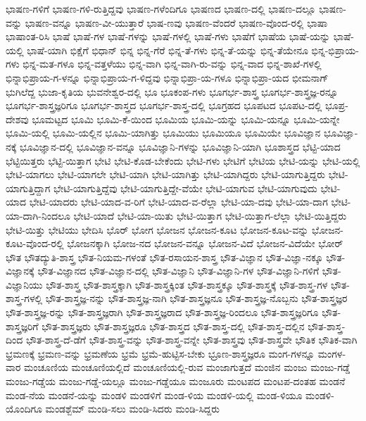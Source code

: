 {ಭಾಷಣ-ಗಳಿಗೆ
ಭಾಷಣ-ಗಳಿ-ರುತ್ತಿದ್ದವು
ಭಾಷಣ-ಗಳೆಂದಿಗೂ
ಭಾಷಣದ
ಭಾಷಣ-ದಲ್ಲಿ
ಭಾಷಣ-ದಲ್ಲೂ
ಭಾಷಣ-ವನ್ನು
ಭಾಷಣ-ವನ್ನೂ
ಭಾಷಣ-ವೀ-ಯುತ್ತಾರೆ
ಭಾಷ-ಣವು
ಭಾಷಣ-ವೆಂದರೆ
ಭಾಷಣ-ವೊಂದ-ರಲ್ಲಿ
ಭಾಷಾ
ಭಾಷಾಂತ-ರಿಸಿ
ಭಾಷೆ
ಭಾಷೆ-ಗಳ
ಭಾಷೆ-ಗಳನ್ನು
ಭಾಷೆ-ಗಳಲ್ಲಿ
ಭಾಷೆ-ಗಳು
ಭಾಷೆಗೆ
ಭಾಷೆಯ
ಭಾಷೆ-ಯನ್ನು
ಭಾಷೆ-ಯಲ್ಲಿ
ಭಾಷೆ-ಯಾಗಿ
ಭಿಕ್ಷೆಗೆ
ಭಿಧಾನ್
ಭಿನ್ನ
ಭಿನ್ನ-ಗೆರೆ
ಭಿನ್ನ-ತೆ-ಗಳು
ಭಿನ್ನ-ತೆ-ಯನ್ನು
ಭಿನ್ನ-ತೆಯೇನೂ
ಭಿನ್ನ-ಭಿಪ್ರಾಯ-ಗಳು
ಭಿನ್ನ-ಮತ-ಗಳೂ
ಭಿನ್ನ-ವತ್ತಳೆಯು
ಭಿನ್ನ-ವಾಗಿ
ಭಿನ್ನ-ವಾಗಿ-ರು-ವನ್ನು
ಭಿನ್ನ-ವಾದ
ಭಿನ್ನ-ಶಾಖೆ-ಗಳಲ್ಲಿ
ಭಿನ್ನಾಭಿಪ್ರಾಯ-ಗ-ಳನ್ನೂ
ಭಿನ್ನಾಭಿಪ್ರಾಯ-ಗ-ಳಿದ್ದವು
ಭಿನ್ನಾಭಿಪ್ರಾ-ಯ-ಗಳೂ
ಭಿನ್ನಾಭಿಪ್ರಾ-ಯದ
ಭೀಮನಾಗ್
ಭುಗಿಲೆದ್ದ
ಭುಜಾ-ಕೃತಿಯ
ಭುವನೇಶ್ವರ-ದಲ್ಲಿ
ಭೂ
ಭೂಕಂಪ-ಗಳು
ಭೂಗರ್ಭ-ಶಾಸ್ತ್ರ
ಭೂಗರ್ಭ-ಶಾಸ್ತ್ರಜ್ಞ-ರನ್ನೂ
ಭೂಗರ್ಭ-ಶಾಸ್ತ್ರಜ್ಞರಿಗೂ
ಭೂಗರ್ಭ-ಶಾಸ್ತ್ರದ
ಭೂಗರ್ಭ-ಶಾಸ್ತ್ರ-ದಲ್ಲಿ
ಭೂಗ್ರಹದ
ಭೂಪಟದ
ಭೂಪಟ-ದಲ್ಲಿ
ಭೂಪ್ರ-ದೇಶವು
ಭೂಮಟ್ಟದ
ಭೂಮಿ
ಭೂಮಿ-ಕೆ-ಯಿಂದ
ಭೂಮಿಯ
ಭೂಮಿ-ಯನ್ನು
ಭೂಮಿ-ಯನ್ನೂ
ಭೂಮಿ-ಯನ್ನೇ
ಭೂಮಿ-ಯಲ್ಲಿ
ಭೂಮಿ-ಯಲ್ಲಿನ
ಭೂಮಿ-ಯಾಗಿತ್ತು
ಭೂಮಿಯು
ಭೂಮಿಯೂ
ಭೂಮಿಯೇ
ಭೂವಿಜ್ಞಾನ
ಭೂವಿಜ್ಞಾ-ನಕ್ಕೆ
ಭೂವಿಜ್ಞಾನ-ದಲ್ಲಿ
ಭೂವಿಜ್ಞಾನ-ವನ್ನೂ
ಭೂವಿಜ್ಞಾನಿ-ಗಳನ್ನು
ಭೂವಿಜ್ಞಾನಿ-ಯಾಗಿ
ಭೂಶಾಸ್ತ್ರದ
ಭೆಟ್ಟಿ-ಯಾದ
ಭೆಟ್ಟಿಯಿತ್ತರು
ಭೆಟ್ಟಿ-ಯಿತ್ತಾಗ
ಭೇಟಿ
ಭೇಟಿ-ಕೊಡ-ಬೇಕೆಂದು
ಭೇಟಿ-ಗಳು
ಭೇಟಿಗೆ
ಭೇಟಿಯ
ಭೇಟಿ-ಯನ್ನು
ಭೇಟಿ-ಯಲ್ಲಿ
ಭೇಟಿ-ಯಾಗಲು
ಭೇಟಿ-ಯಾಗಲೇ
ಭೇಟಿ-ಯಾಗಿ
ಭೇಟಿ-ಯಾಗಿತ್ತು
ಭೇಟಿ-ಯಾಗಿದ್ದರು
ಭೇಟಿ-ಯಾಗುತ್ತಿದ್ದರು
ಭೇಟಿ-ಯಾಗುತ್ತಿದ್ದಾಗ
ಭೇಟಿ-ಯಾಗುತ್ತಿದ್ದೆವು
ಭೇಟಿ-ಯಾಗುತ್ತಿದ್ದೇ-ವೆಯೇ
ಭೇಟಿ-ಯಾಗುವ
ಭೇಟಿ-ಯಾಗುವುದು
ಭೇಟಿ-ಯಾದ
ಭೇಟಿ-ಯಾದರು
ಭೇಟಿ-ಯಾದ-ವ-ರಿಗೆ
ಭೇಟಿ-ಯಾದ-ವ-ರೆಲ್ಲಾ
ಭೇಟಿ-ಯಾ-ದವು
ಭೇಟಿ-ಯಾ-ದಾಗ
ಭೇಟಿ-ಯಾ-ದಾಗಿ-ನಿಂದಲೂ
ಭೇಟಿ-ಯಾದೆ
ಭೇಟಿ-ಯಾ-ಯಿತು
ಭೇಟಿ-ಯಿತ್ತಾಗ
ಭೇಟಿ-ಯಿತ್ತಾಗ-ಲೆಲ್ಲಾ
ಭೇಟಿ-ಯಿತ್ತಿದ್ದರು
ಭೇಟಿ-ಯಿತ್ತು
ಭೇಟಿಯು
ಭೇದಿಸಿ
ಭೊರ್
ಭೋಗ
ಭೋಜನ
ಭೋಜನ-ಕೂಟ
ಭೋಜನ-ಕೂಟ-ವನ್ನು
ಭೋಜನ-ಕೂಟ-ವೊಂದ-ರಲ್ಲಿ
ಭೋಜನಕ್ಕಾಗಿ
ಭೋಜ-ನದ
ಭೋಜನ-ವನ್ನೂ
ಭೋಜನ-ವಿದೆ
ಭೋಜನ-ವಿದೆಯೇ
ಭೋರ್
ಭೌತ
ಭೌತದ್ಯುತಿ-ಶಾಸ್ತ್ರ
ಭೌತ-ನಿಯಮ-ಗಳಂತೆ
ಭೌತ-ರಸಾಯನ-ಶಾಸ್ತ್ರ
ಭೌತ-ವಿಜ್ಞಾನ
ಭೌತ-ವಿಜ್ಞಾ-ನಕ್ಕೂ
ಭೌತ-ವಿಜ್ಞಾನಕ್ಕೆ
ಭೌತ-ವಿಜ್ಞಾನದ
ಭೌತ-ವಿಜ್ಞಾನ-ದಲ್ಲಿ
ಭೌತ-ವಿಜ್ಞಾನಿ
ಭೌತ-ವಿಜ್ಞಾನಿ-ಗಳ
ಭೌತ-ವಿಜ್ಞಾನಿ-ಗಳಿಗೆ
ಭೌತ-ವಿಜ್ಞಾನಿಯು
ಭೌತ-ಶಾಸ್ತ್ರ
ಭೌತ-ಶಾಸ್ತ್ರಕ್ಕಾಗಿ
ಭೌತ-ಶಾಸ್ತ್ರಕ್ಕಿಂತ
ಭೌತ-ಶಾಸ್ತ್ರಕ್ಕೂ
ಭೌತ-ಶಾಸ್ತ್ರಕ್ಕೆ
ಭೌತ-ಶಾಸ್ತ್ರ-ಗಳ
ಭೌತ-ಶಾಸ್ತ್ರ-ಗಳಲ್ಲಿ
ಭೌತ-ಶಾಸ್ತ್ರಜ್ಞ-ನನ್ನು
ಭೌತ-ಶಾಸ್ತ್ರಜ್ಞ-ನಾಗಿ
ಭೌತ-ಶಾಸ್ತ್ರಜ್ಞನೂ
ಭೌತ-ಶಾಸ್ತ್ರಜ್ಞ-ನೊಬ್ಬನು
ಭೌತ-ಶಾಸ್ತ್ರಜ್ಞರ
ಭೌತ-ಶಾಸ್ತ್ರಜ್ಞ-ರನ್ನು
ಭೌತ-ಶಾಸ್ತ್ರಜ್ಞರಾಗಿ
ಭೌತ-ಶಾಸ್ತ್ರಜ್ಞರಾದ
ಭೌತ-ಶಾಸ್ತ್ರಜ್ಞ-ರಿಂದಲೂ
ಭೌತ-ಶಾಸ್ತ್ರಜ್ಞರಿಗೂ
ಭೌತ-ಶಾಸ್ತ್ರಜ್ಞರಿಗೆ
ಭೌತ-ಶಾಸ್ತ್ರಜ್ಞರು
ಭೌತ-ಶಾಸ್ತ್ರಜ್ಞರೂ
ಭೌತ-ಶಾಸ್ತ್ರದ
ಭೌತ-ಶಾಸ್ತ್ರ-ದಲ್ಲಿ
ಭೌತ-ಶಾಸ್ತ್ರ-ದಲ್ಲಿನ
ಭೌತ-ಶಾಸ್ತ್ರ-ದಿಂದ
ಭೌತ-ಶಾಸ್ತ್ರ-ದೆ-ಡೆಗೆ
ಭೌತ-ಶಾಸ್ತ್ರ-ವನ್ನು
ಭೌತ-ಶಾಸ್ತ್ರ-ವನ್ನೇ
ಭೌತ-ಶಾಸ್ತ್ರವು
ಭೌತ-ಶಾಸ್ತ್ರವೇ
ಭೌತಿಕ
ಭೌತಿಕ-ವಾಗಿ
ಭ್ರಮಣಕ್ಕೆ
ಭ್ರಮಣ-ವನ್ನು
ಭ್ರಮಣೆಯ
ಭ್ರಮೆ
ಭ್ರಮೆ-ಹುಟ್ಟಿಸ-ಬೇಕು
ಭ್ರೂಣ-ಶಾಸ್ತ್ರಜ್ಞರೂ
ಮಂಗ-ಗಳನ್ನೂ
ಮಂಗಳ-ವಾರ
ಮಂಚೂಣಿಯ
ಮಂಚೂಣಿಯಲ್ಲಿದೆ
ಮಂಚೂಣಿಯಲ್ಲಿ-ರುವ
ಮಂಜಾಗುತ್ತದೆ
ಮಂಜಿನ
ಮಂಜು
ಮಂಜು-ಗಡ್ಡೆ
ಮಂಜು-ಗಡ್ಡೆಯ
ಮಂಜು-ಗಡ್ಡೆ-ಯಲ್ಲೂ
ಮಂಜು-ಗಡ್ಡೆಯೂ
ಮಂಜೂರು
ಮಂಟಪದ
ಮಂಟಪ-ದಂತಹ
ಮಂಡನೆ
ಮಂಡ-ನೆಯ
ಮಂಡನೆ-ಯನ್ನು
ಮಂಡಳಿ
ಮಂಡಳಿಗೆ
ಮಂಡ-ಳಿಯ
ಮಂಡಳಿ-ಯಲ್ಲಿ
ಮಂಡ-ಳಿಯೂ
ಮಂಡಳಿ-ಯೊಂದಿಗೂ
ಮಂಡಶ್ಬೆಮ್
ಮಂಡಿ-ಸಲು
ಮಂಡಿ-ಸಿದರು
ಮಂಡಿ-ಸಿದ್ದರು
}
